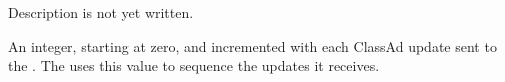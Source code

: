 \begin{description}
\item[\AdAttr{PublicNetworkIpAddr}:] Description is not yet written.

\item[\AdAttr{UpdateSequenceNumber}:] An integer, starting at zero,
  and incremented with each ClassAd update sent to the .
  The  uses this value to sequence the updates it
  receives.

\end{description}

